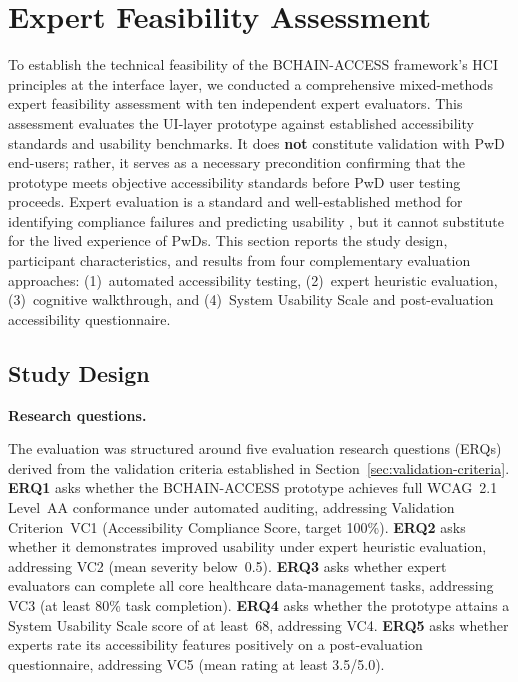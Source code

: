 \documentclass[journal,onecolumn]{IEEEtran}
\begin{document}
\section{Expert Feasibility Assessment}
\label{sec:feasibility}

To establish the technical feasibility of the BCHAIN-ACCESS framework's HCI principles at the interface layer, we conducted a comprehensive mixed-methods expert feasibility assessment with ten independent expert evaluators. This assessment evaluates the UI-layer prototype against established accessibility standards and usability benchmarks. It does \textbf{not} constitute validation with PwD end-users; rather, it serves as a necessary precondition confirming that the prototype meets objective accessibility standards before PwD user testing proceeds. Expert evaluation is a standard and well-established method for identifying compliance failures and predicting usability \cite{nielsen1992finding}, but it cannot substitute for the lived experience of PwDs. This section reports the study design, participant characteristics, and results from four complementary evaluation approaches: (1)~automated accessibility testing, (2)~expert heuristic evaluation, (3)~cognitive walkthrough, and (4)~System Usability Scale and post-evaluation accessibility questionnaire.

\subsection{Study Design}
\label{subsec:study-design}

\noindent\textbf{Research questions.}

The evaluation was structured around five evaluation research questions
(ERQs) derived from the validation criteria established in Section~\ref{sec:validation-criteria}. \textbf{ERQ1} asks whether the BCHAIN-ACCESS prototype achieves full WCAG~2.1 Level~AA conformance under automated auditing, addressing Validation Criterion~VC1 (Accessibility Compliance Score, target 100\%). \textbf{ERQ2} asks whether it demonstrates improved usability under expert heuristic evaluation, addressing VC2 (mean severity below~0.5). \textbf{ERQ3} asks whether expert evaluators can complete all core healthcare data-management tasks, addressing VC3 (at least 80\% task completion). \textbf{ERQ4} asks whether the prototype attains a System Usability Scale score of at least~68, addressing VC4. \textbf{ERQ5} asks whether experts rate its accessibility features positively on a post-evaluation questionnaire, addressing VC5 (mean rating at least 3.5/5.0).
\end{document}
